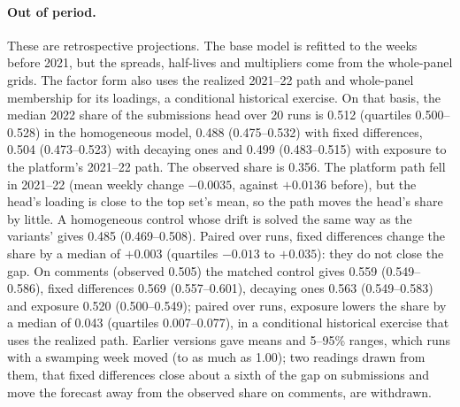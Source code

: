 \documentclass[10pt]{article}
\begin{document}
\paragraph{Out of period.} These are retrospective projections. The base model is refitted to the weeks before 2021, but the spreads, half-lives and multipliers come from the whole-panel grids. The factor form also uses the realized 2021--22 path and whole-panel membership for its loadings, a conditional historical exercise. On that basis, the median 2022 share of the submissions head over 20 runs is 0.512 (quartiles 0.500--0.528) in the homogeneous model, 0.488 (0.475--0.532) with fixed differences, 0.504 (0.473--0.523) with decaying ones and 0.499 (0.483--0.515) with exposure to the platform's 2021--22 path. The observed share is 0.356. The platform path fell in 2021--22 (mean weekly change $-0.0035$, against $+0.0136$ before), but the head's loading is close to the top set's mean, so the path moves the head's share by little. A homogeneous control whose drift is solved the same way as the variants' gives 0.485 (0.469--0.508). Paired over runs, fixed differences change the share by a median of $+0.003$ (quartiles $-0.013$ to $+0.035$): they do not close the gap. On comments (observed 0.505) the matched control gives 0.559 (0.549--0.586), fixed differences 0.569 (0.557--0.601), decaying ones 0.563 (0.549--0.583) and exposure 0.520 (0.500--0.549); paired over runs, exposure lowers the share by a median of 0.043 (quartiles 0.007--0.077), in a conditional historical exercise that uses the realized path. Earlier versions gave means and 5--95\% ranges, which runs with a swamping week moved (to as much as 1.00); two readings drawn from them, that fixed differences close about a sixth of the gap on submissions and move the forecast away from the observed share on comments, are withdrawn.
\end{document}

